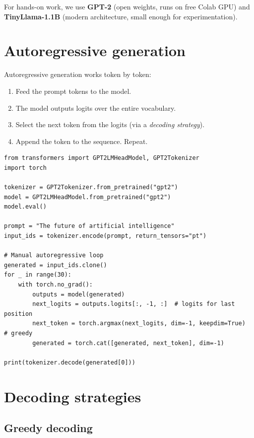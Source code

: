 For hands-on work, we use \textbf{GPT-2} (open weights, runs on free Colab GPU) and \textbf{TinyLlama-1.1B} (modern architecture, small enough for experimentation).

\section{Autoregressive generation}

Autoregressive generation works token by token:
\begin{enumerate}
  \item Feed the prompt tokens to the model.
  \item The model outputs logits over the entire vocabulary.
  \item Select the next token from the logits (via a \emph{decoding strategy}).
  \item Append the token to the sequence. Repeat.
\end{enumerate}

\begin{verbatim}
from transformers import GPT2LMHeadModel, GPT2Tokenizer
import torch

tokenizer = GPT2Tokenizer.from_pretrained("gpt2")
model = GPT2LMHeadModel.from_pretrained("gpt2")
model.eval()

prompt = "The future of artificial intelligence"
input_ids = tokenizer.encode(prompt, return_tensors="pt")

# Manual autoregressive loop
generated = input_ids.clone()
for _ in range(30):
    with torch.no_grad():
        outputs = model(generated)
        next_logits = outputs.logits[:, -1, :]  # logits for last position
        next_token = torch.argmax(next_logits, dim=-1, keepdim=True)  # greedy
        generated = torch.cat([generated, next_token], dim=-1)

print(tokenizer.decode(generated[0]))
\end{verbatim}

\section{Decoding strategies}

\subsection{Greedy decoding}

